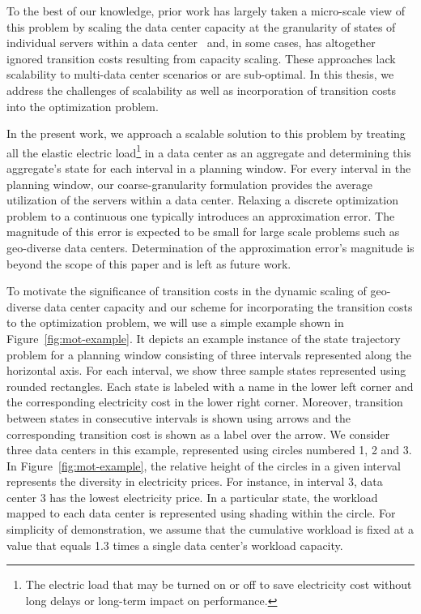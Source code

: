 To the best of our knowledge, prior work has largely taken a micro-scale view of this problem by scaling the data center capacity at the granularity of states of individual servers within a data center~\cite{Li:Optimal:TSG:2012,LinInfocom11,serverEnergy,Mazzucco2012415,rao2010,qureshi2009cutting} and, in some cases, has altogether ignored transition costs resulting from capacity scaling. These approaches lack scalability to multi-data center scenarios or are sub-optimal. In this thesis, we address the challenges of scalability as well as incorporation of transition costs into the optimization problem.

In the present work, we approach a scalable solution to this problem by treating all the elastic electric load\footnote{The electric load that may be turned on or off to save electricity cost without long delays or long-term impact on performance.} in a data center as an aggregate and determining this aggregate's state for each interval in a planning window. For every interval in the planning window, our coarse-granularity formulation provides the average utilization of the servers within a data center. Relaxing a discrete optimization problem to a continuous one typically introduces an approximation error. The magnitude of this error is expected to be small for large scale problems such as geo-diverse data centers. Determination of the approximation error's magnitude is beyond the scope of this paper and is left as future work.

To motivate the significance of transition costs in the dynamic scaling of geo-diverse data center capacity and our scheme for incorporating the transition costs to the optimization problem, we will use a simple example shown in Figure~\ref{fig:mot-example}. It depicts an example instance of the
state trajectory problem for a planning window consisting of
three intervals represented along the horizontal axis. For each interval, we show three sample states represented using rounded rectangles. Each state is labeled with a name in the lower left corner and the corresponding electricity cost in the lower right corner. Moreover, transition between states in consecutive intervals is shown using arrows and the corresponding transition cost is shown as a label over the arrow. We consider three data centers in this example, represented using circles
numbered 1, 2 and 3. In Figure~\ref{fig:mot-example}, the relative height of the circles in a given interval represents the diversity in electricity prices. For instance, in interval 3, data center 3 has the lowest electricity price. In a particular state, the workload mapped to each data center is represented using shading within the circle. For simplicity of demonstration, we assume that the cumulative
workload is fixed at a value that equals 1.3 times a single
data center's workload capacity. 


